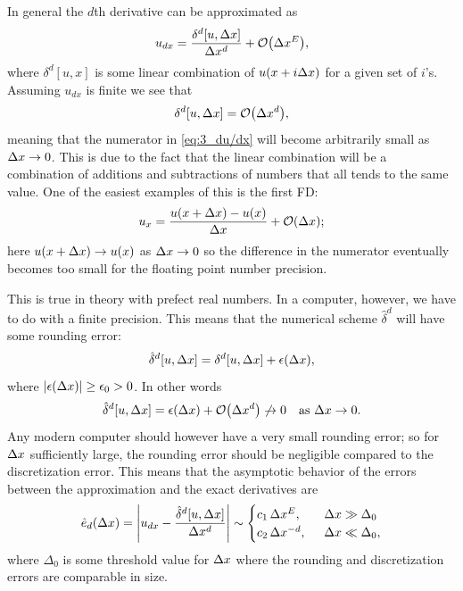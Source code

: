 \documentclass[11pt,letter, swedish, english
]{article}
\begin{document}
In general the $d$th derivative can be approximated as
\begin{equation}\label{eq:3_du/dx}
u_{dx}=\frac{\delta^d[u, \Dx]}{\Dx^d}+\order{\Dx^E},
\end{equation}
where $\delta^d[u, x]$ is some linear combination of $u(x+i\Delta{x})$ for a
given set of $i$'s. Assuming $u_{dx}$ is finite we see that
\begin{equation}
\delta^d[u, \Dx]=\order{\Dx^d},
\end{equation}
meaning that the numerator in \eqref{eq:3_du/dx} will become
arbitrarily small as $\Delta{x}\to0$. This is due to the fact that the
linear combination will be a combination of additions and subtractions
of numbers that all tends to the same value. One of the easiest
examples of this is the first FD:
\begin{equation}
u_x=\frac{u(x+\Dx)-u(x)}{\Dx}+\order{\Dx};
\end{equation}
here $u(x+\Delta{x})\to u(x)$ as $\Delta{x}\to0$ so the difference in the
numerator eventually becomes too small for the floating point number
precision. 

This is true in theory with prefect real numbers. In a computer,
however, we have to do with a finite precision. This means that the
numerical scheme $\hat\delta^d$ will have some rounding error:
\begin{equation}
\hat\delta^d[u, \Delta{x}]=\delta^d[u, \Delta{x}]+\epsilon(\Delta{x}),
\end{equation}
where $|\epsilon(\Delta{x})|\ge\epsilon_0>0$. In other words
\begin{equation}
\hat\delta^d[u, \Dx]=\epsilon(\Dx)+\order{\Dx^d}\not\to0
\quad\text{as } \Dx\to0.
\end{equation}
Any modern computer should however have a very small rounding error;
so for $\Delta{x}$ sufficiently large, the rounding error should be negligible
compared to the discretization error.
This means that the asymptotic\footnotemark{} behavior of the errors
between the approximation and the exact derivatives are 
\begin{equation}
\hat{e}_d(\Dx)=\abs{u_{dx}-\frac{\hat\delta^d[u, \Dx]}{\Dx^d}}
\sim\begin{cases}
c_1\,\Dx^E\qcomma& \Dx\gg\Delta_0\\
c_2\,\Dx^{-d},& \Dx\ll\Delta_0,
\end{cases}
\end{equation}
where $\Delta_0$ is some threshold value for $\Delta{x}$ where the rounding
and discretization errors are comparable in size. 
\end{document}
